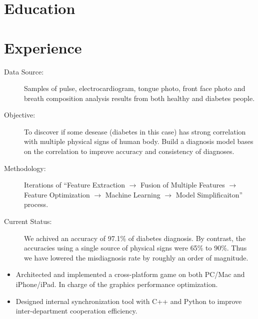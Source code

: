 \documentclass[10pt,a4paper]{moderncv/moderncv}
\begin{document}
\maketitle

\section{Education}


\section{Experience}
{
\begin{description}
	\item[Data Source:] Samples of pulse, electrocardiogram, tongue photo, front face photo and breath composition analysis results from both healthy and diabetes people.
	\item[Objective:] To discover if some desease (diabetes in this case) has strong correlation with multiple physical signs of human body. Build a diagnosis model bases on the correlation to improve accuracy and consistency of diagnoses.
	\item[Methodology:] Iterations of ``Feature Extraction $\rightarrow$ Fusion of Multiple Features $\rightarrow$ Feature Optimization $\rightarrow$ Machine Learning $\rightarrow$ Model Simplificaiton'' process.
	\item[Current Status:]  We achived an accuracy of 97.1\% of diabetes diagnosis. By contrast, the accuracies using a single source of physical signs were 65\% to 90\%. Thus we have lowered the misdiagnosis rate by roughly an order of magnitude.
\end{description}
}

{
\begin{itemize}
	\item Architected and implemented a cross-platform game on both PC/Mac and iPhone/iPad. In charge of the graphics performance optimization.
	\item Designed internal synchronization tool with C++ and Python to improve inter-department cooperation efficiency.
\end{itemize}
}
\end{document}

